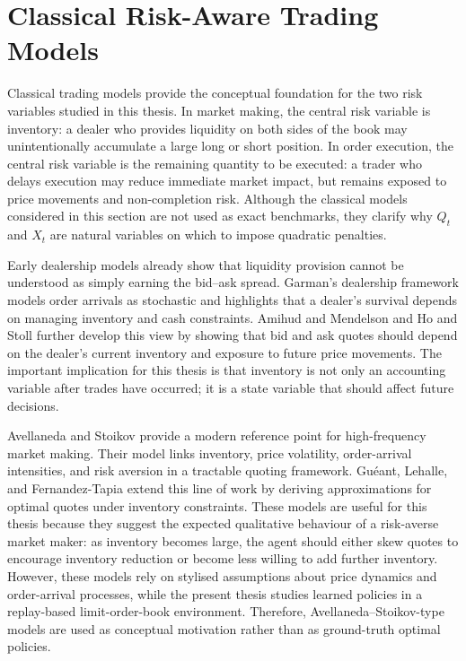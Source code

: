 \documentclass[oneside]{uva-inf-bachelor-thesis}
\begin{document}
\section{Classical Risk-Aware Trading Models}

Classical trading models provide the conceptual foundation for the two risk variables studied in this thesis. In market making, the central risk variable is inventory: a dealer who provides liquidity on both sides of the book may unintentionally accumulate a large long or short position. In order execution, the central risk variable is the remaining quantity to be executed: a trader who delays execution may reduce immediate market impact, but remains exposed to price movements and non-completion risk. Although the classical models considered in this section are not used as exact benchmarks, they clarify why \(Q_t\) and \(X_t\) are natural variables on which to impose quadratic penalties.

Early dealership models already show that liquidity provision cannot be understood as simply earning the bid--ask spread. Garman's dealership framework \cite{garman_market_1976} models order arrivals as stochastic and highlights that a dealer's survival depends on managing inventory and cash constraints. Amihud and Mendelson \cite{amihud_dealership_1980} and Ho and Stoll \cite{ho_optimal_1981} further develop this view by showing that bid and ask quotes should depend on the dealer's current inventory and exposure to future price movements. The important implication for this thesis is that inventory is not only an accounting variable after trades have occurred; it is a state variable that should affect future decisions.

Avellaneda and Stoikov \cite{avellaneda_high-frequency_2008} provide a modern reference point for high-frequency market making. Their model links inventory, price volatility, order-arrival intensities, and risk aversion in a tractable quoting framework. Guéant, Lehalle, and Fernandez-Tapia \cite{gueant_dealing_2013} extend this line of work by deriving approximations for optimal quotes under inventory constraints. These models are useful for this thesis because they suggest the expected qualitative behaviour of a risk-averse market maker: as inventory becomes large, the agent should either skew quotes to encourage inventory reduction or become less willing to add further inventory. However, these models rely on stylised assumptions about price dynamics and order-arrival processes, while the present thesis studies learned policies in a replay-based limit-order-book environment. Therefore, Avellaneda--Stoikov-type models are used as conceptual motivation rather than as ground-truth optimal policies.
\end{document}
